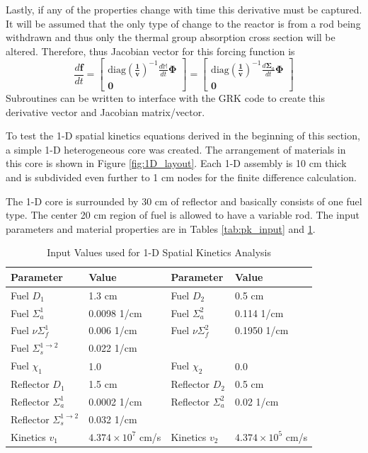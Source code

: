\documentclass{ansconf}
\numberwithin{equation}{section}
\begin{document}
Lastly, if any of the properties change with time this derivative must be captured. It will be assumed that the only type of change to the reactor is from a rod being withdrawn and thus only the thermal group absorption cross section will be altered.  Therefore, thus Jacobian vector for this forcing function is
\begin{equation}
    \frac{d\mathbf{f}}{dt} = \left[ \begin{array}{c}
    \mathrm{diag}\left(\boldsymbol{\frac{1}{v}}\right)^{-1} \frac{d\mathbb{M}}{dt}\boldsymbol{\Phi} \\ \mathbf{0}
    \end{array}\right] = \left[ \begin{array}{c}
    \mathrm{diag}\left(\boldsymbol{\frac{1}{v}}\right)^{-1} \frac{d\boldsymbol{\Sigma}_a}{dt}\boldsymbol{\Phi} \\ \mathbf{0}
    \end{array}\right]
\end{equation}
Subroutines can be written to interface with the GRK code to create this derivative vector and Jacobian matrix/vector.


To test the 1-D spatial kinetics equations derived in the beginning of this section, a simple 1-D heterogeneous core was created. The arrangement of materials in this core is shown in Figure \ref{fig:1D_layout}. Each 1-D assembly is 10 cm thick and is subdivided even further to 1 cm nodes for the finite difference calculation.  

The 1-D core is surrounded by 30 cm of reflector and basically consists of one fuel type. The center 20 cm region of fuel is allowed to have a variable rod. The input parameters and material properties are in Tables \ref{tab:pk_input} and \ref{tab:1D_input}.
\begin{table}
\caption{Input Values used for 1-D Spatial Kinetics Analysis}
\label{tab:1D_input}
\centering
\begin{tabular}{ll||ll}
\toprule 
Parameter & Value & Parameter & Value\tabularnewline
\midrule
\midrule 
Fuel $D_1$ & 1.3 cm & Fuel $D_2$ & 0.5 cm \tabularnewline
Fuel $\Sigma_a^1$ & 0.0098 1/cm & Fuel $\Sigma_a^2$ & 0.114 1/cm \tabularnewline
Fuel $\nu\Sigma_f^1$ & 0.006 1/cm & Fuel $\nu\Sigma_f^2$ & 0.1950 1/cm \tabularnewline
Fuel $\Sigma_s^{1\rightarrow 2}$ & 0.022 1/cm \tabularnewline
Fuel $\chi_1$ & 1.0 & Fuel $\chi_2$ & 0.0 \tabularnewline
Reflector $D_1$ & 1.5 cm & Reflector $D_2$ & 0.5 cm \tabularnewline
Reflector $\Sigma_a^1$ & 0.0002 1/cm & Reflector $\Sigma_a^2$ & 0.02 1/cm \tabularnewline
Reflector $\Sigma_s^{1\rightarrow 2}$ & 0.032 1/cm \tabularnewline
Kinetics $v_1$ & $4.374\times 10^7$ cm/s & Kinetics $v_2$ & $4.374\times 10^5$ cm/s \tabularnewline
\bottomrule
\end{tabular}
\end{table}
\end{document}
